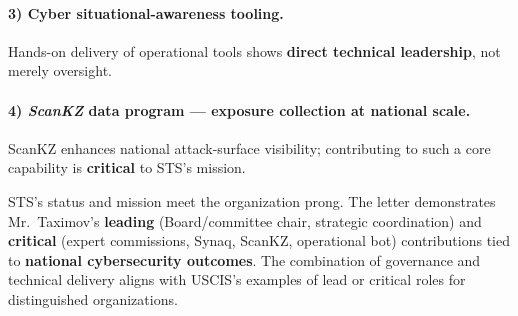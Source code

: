 \paragraph{3) Cyber situational-awareness tooling.}
Hands-on delivery of operational tools shows \textbf{direct technical leadership}, not merely oversight.

\paragraph{4) \emph{ScanKZ} data program — exposure collection at national scale.}
ScanKZ enhances national attack-surface visibility; contributing to such a core capability is \textbf{critical} to STS’s mission.

STS’s status and mission meet the organization prong. The letter demonstrates Mr.\ Taximov’s \textbf{leading} (Board/committee chair, strategic coordination) and \textbf{critical} (expert commissions, Synaq, ScanKZ, operational bot) contributions tied to \textbf{national cybersecurity outcomes}. The combination of governance and technical delivery aligns with USCIS’s examples of lead or critical roles for distinguished organizations.

